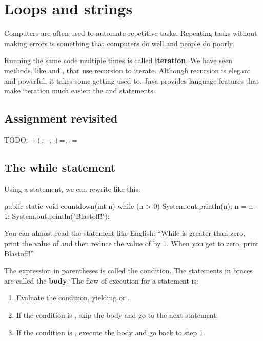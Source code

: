 \chapter{Loops and strings}

Computers are often used to automate repetitive tasks.
Repeating tasks without making errors is something that computers do well and people do poorly.


Running the same code multiple times is called {\bf iteration}.
We have seen methods, like  and , that use recursion to iterate.
Although recursion is elegant and powerful, it takes some getting used to.
Java provides language features that make iteration much easier:
the  and  statements.


\section{Assignment revisited}

TODO: ++, --, +=, -=


\section{The while statement}
\label{while}


Using a  statement, we can rewrite  like this:

\begin{code}
public static void countdown(int n) {
    while (n > 0) {
        System.out.println(n);
        n = n - 1;
    }
    System.out.println("Blastoff!");
}
\end{code}

You can almost read the  statement like English:
``While  is greater than zero, print the value of  and then reduce the value of  by 1.
When you get to zero, print Blastoff!''


The expression in parentheses is called the condition.
The statements in braces are called the {\bf body}.
The flow of execution for a  statement is:

\begin{enumerate}

\item Evaluate the condition, yielding  or .

\item If the condition is , skip the body and go to the next statement.

\item If the condition is , execute the body and go back to step 1.

\end{enumerate}


